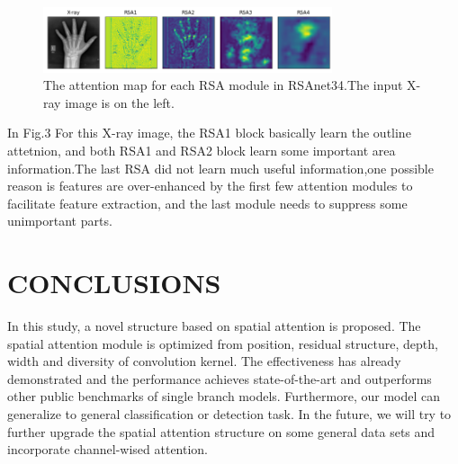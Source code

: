 \documentclass{article}
\begin{document}
\begin{figure}[htb]

\begin{minipage}[b]{1.0\linewidth}
  \centering
  \centerline{\includegraphics[width=8.5cm]{result.png}}
\end{minipage}
%
%
\caption{The attention map for each RSA module in RSAnet34.The input X-ray image is on the left.}
\label{fig:res}
%
\end{figure}
In Fig.3 For this X-ray image, the RSA1 block basically learn the outline attetnion, and both RSA1 and RSA2 block learn some important area information.The last RSA did not learn much useful information,one possible reason is features are over-enhanced by the first few attention modules to  facilitate feature extraction, and the last module needs to suppress some unimportant parts.
\section{CONCLUSIONS}
\label{sec:typestyle}
In this study, a novel structure based on spatial attention is proposed. The spatial attention module is optimized from position, residual structure, depth, width and diversity of convolution kernel. The effectiveness has already demonstrated and the performance achieves state-of-the-art and outperforms other public benchmarks of single branch models. Furthermore, our model can generalize to general classification or detection task. In the future, we will try to further upgrade the spatial attention structure on some general data sets and incorporate channel-wised attention.




\end{document}
